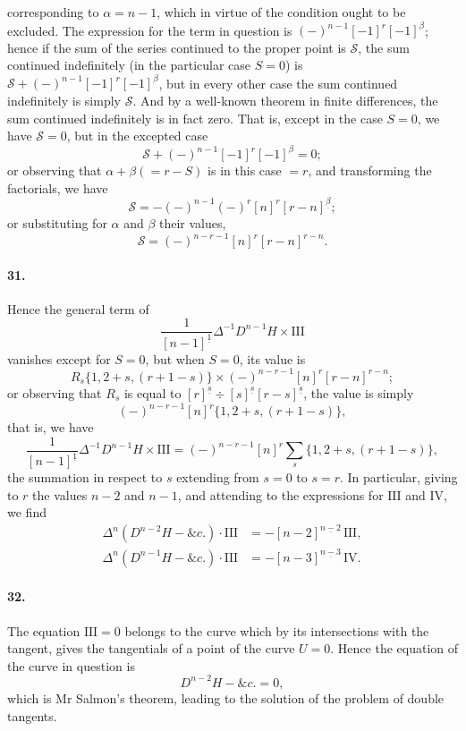 \documentclass[11pt,a4paper]{book}
\begin{document}
corresponding  to  $\alpha = n - 1$,  which  in  virtue  of  the  condition  ought  to  be  excluded.  The  expression  for
the  term  in  question  is  $(-)^{n-1} [-1]^r [-1]^\beta$;  hence  if  the  sum  of  the  series  continued
to  the  proper  point  is  $\mathcal{S}$,  the  sum  continued  indefinitely  (in  the  particular  case  $S = 0$)
is  $\mathcal{S} + (-)^{n-1} [-1]^r [-1]^\beta$,  but  in  every  other  case  the  sum  continued  indefinitely  is
simply  $\mathcal{S}$.  And  by  a  well-known  theorem  in  finite  differences,  the  sum  continued
indefinitely  is  in  fact  zero.  That  is,  except  in  the  case  $S = 0$,  we  have  $\mathcal{S} = 0$,  but  in  the
excepted  case
\[
\mathcal{S} + (-)^{n-1} [-1]^r [-1]^\beta = 0;
\]
or  observing  that  $\alpha + \beta (= r - S)$  is  in  this  case  $= r$,  and  transforming  the  factorials,
we  have
\[
\mathcal{S} = -(-)^{n-1} (-)^{r} [n]^r [r-n]^{\underline{\beta}};
\]
or  substituting  for  $\alpha$  and  $\beta$  their  values,
\[
\mathcal{S} = (-)^{n-r-1} [n]^r [r-n]^{r-n}.
\]

\paragraph{31.}
Hence  the  general  term  of
\[
\frac{1}{[n-1]^{\underline{1}}} \Delta^{-1} D^{n-1} H \times \mathrm{III}
\]
vanishes  except  for  $S = 0$,  but  when  $S = 0$,  its  value  is
\[
R_s \{1, 2+s, (r+1-s)\} \times (-)^{n-r-1} [n]^r [r-n]^{r-n};
\]
or  observing  that  $R_s$  is  equal  to  $[r]^{\underline{s}} \div [s]^{\underline{s}} [r-s]^{\underline{s}}$,  the  value  is  simply
\[
(-)^{n-r-1} [n]^r \{1, 2+s, (r+1-s)\},
\]
that  is,  we  have
\[
\frac{1}{[n-1]^{\underline{1}}} \Delta^{-1} D^{n-1} H \times \mathrm{III}
= (-)^{n-r-1} [n]^r \sum_s \{1, 2+s, (r+1-s)\},
\]
the  summation   in  respect  to   $s$  extending  from   $s = 0$  to  $s = r$.      In  particular,   giving  to
$r$  the  values  $n-2$  and  $n-1$,  and  attending  to  the  expressions  for  $\mathrm{III}$  and  $\mathrm{IV}$,  we  find
\begin{align*}
\Delta^n (D^{n-2} H - \&c.) \cdot \mathrm{III} &= -[n-2]^{\underline{n-2}} \, \mathrm{III}, \\
\Delta^n (D^{n-1} H - \&c.) \cdot \mathrm{III} &= -[n-3]^{\underline{n-3}} \, \mathrm{IV}.
\end{align*}

\paragraph{32.}
The  equation  $\mathrm{III} = 0$  belongs  to  the  curve  which  by  its  intersections  with  the
tangent,  gives  the  tangentials  of  a  point  of  the  curve  $U = 0$.  Hence  the  equation  of
the  curve  in  question  is
\[
D^{n-2} H - \&c. = 0,
\]
which   is    Mr   Salmon's    theorem,   leading    to    the    solution    of    the    problem    of   double
tangents.
\end{document}
